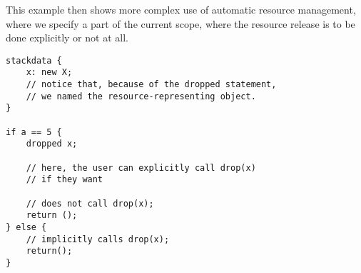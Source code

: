 \begin{ex}
    This example then shows more complex use of automatic resource management, where we specify a part of the current scope, where the resource release is to be done explicitly or not at all.

    \begin{lstlisting}
stackdata {
    x: new X;
    // notice that, because of the dropped statement,
    // we named the resource-representing object.
}

if a == 5 {
    dropped x;

    // here, the user can explicitly call drop(x)
    // if they want

    // does not call drop(x);
    return ();
} else {
    // implicitly calls drop(x);
    return();
}
    \end{lstlisting}
\end{ex}

